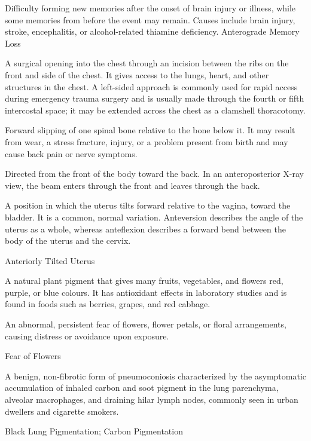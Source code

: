  Difficulty forming new memories after the onset of brain injury or illness, while some memories from before the event may remain. Causes include brain injury, stroke, encephalitis, or alcohol-related thiamine deficiency.
\synonyms
Anterograde Memory Loss

 A surgical opening into the chest through an incision between the ribs on the
front and side of the chest. It gives access to the lungs, heart, and other structures in the chest. A left-sided
approach is commonly used for rapid access during emergency trauma surgery and is usually made through the
fourth or fifth intercostal space; it may be extended across the chest as a clamshell thoracotomy.

 Forward slipping of one spinal bone relative to the bone below it. It may result from wear, a stress fracture, injury, or a problem present from birth and may cause back pain or nerve symptoms.

 Directed from the front of the body toward the back. In an anteroposterior X-ray view, the beam enters through the front and leaves through the back.

 A position in which the uterus tilts forward relative to the vagina,
toward the bladder. It is a common, normal variation. Anteversion describes the angle of the uterus
as a whole, whereas anteflexion describes a forward bend between the body of the uterus and the
cervix.

\synonyms
Anteriorly Tilted Uterus

 A natural plant pigment that gives many fruits, vegetables, and flowers red, purple, or blue colours. It has antioxidant effects in laboratory studies and is found in foods such as berries, grapes, and red cabbage.

 An abnormal, persistent fear of flowers, flower petals, or floral arrangements, causing distress or avoidance upon exposure.

\synonyms
Fear of Flowers

 A benign, non-fibrotic form of pneumoconiosis characterized by the asymptomatic accumulation of inhaled carbon and soot pigment in the lung parenchyma, alveolar macrophages, and draining hilar lymph nodes, commonly seen in urban dwellers and cigarette smokers.

\synonyms
Black Lung Pigmentation; Carbon Pigmentation

